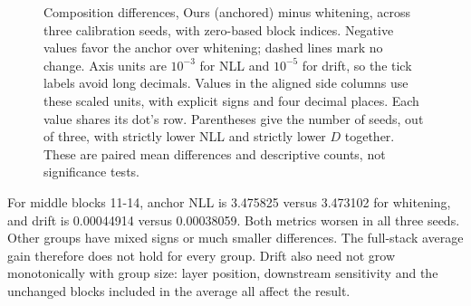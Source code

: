 \documentclass[conference]{IEEEtran}
\begin{document}
\begin{figure}[t]
\caption{Composition differences, Ours (anchored) minus whitening, across three calibration seeds, with zero-based
block indices. Negative values favor the anchor over whitening; dashed lines
mark no change. Axis units are $10^{-3}$ for NLL and $10^{-5}$ for drift, so the
tick labels avoid long decimals. Values in the aligned side columns use these
scaled units, with explicit signs and four decimal places. Each value shares
its dot's row. Parentheses give the number of seeds, out of
three, with strictly lower NLL and strictly lower $D$ together. These are paired
mean differences and descriptive counts, not significance tests.}
\label{fig:composition-differences}
\end{figure}
For middle blocks 11-14, anchor NLL is 3.475825 versus 3.473102 for whitening, and drift is 0.00044914 versus 0.00038059. Both metrics worsen in all three seeds. Other groups have mixed signs or much smaller differences. The full-stack average gain therefore does not hold for every group. Drift also need not grow monotonically with group size: layer position, downstream sensitivity and the unchanged blocks included in the average all affect the result.\par\smallskip
\end{document}
